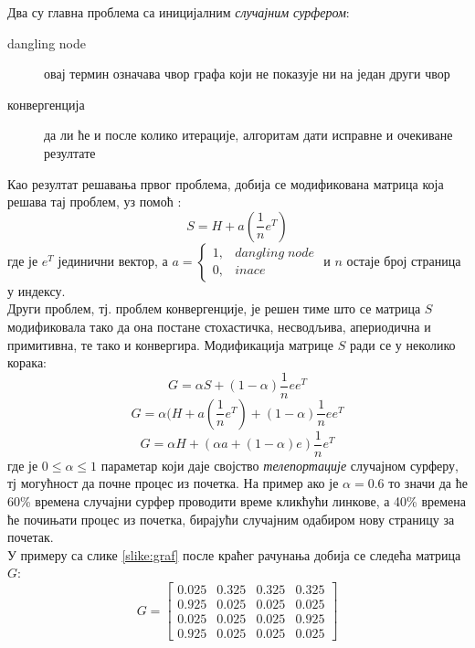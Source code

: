         Два су главна проблема са иницијалним \emph{случајним сурфером}:
        \begin{description}
        \item[dangling node] овај термин означава чвор графа који не показује ни на један други чвор
        \item[конвергенција] да ли ће и после колико итерације, алгоритам дати исправне и очекиване резултате
        \end{description}
        Као резултат решавања првог проблема, добија се модификована матрица која решава тај проблем, уз помоћ :
        \begin{equation}
        S = H + a(\frac{1}{n}e^{T})
        \end{equation}
        где је $e^T$ јединични вектор, а $a = \left\{\begin{matrix}
1, & dangling\; node \\ 
0, & inace
\end{matrix}\right.$ и $n$ остаје број страница у индексу.\\
        Други проблем, тј. проблем конвергенције, је решен тиме што се матрица $S$ модификовала тако да она постане стохастичка, несводљива, апериодична и примитивна, те тако и конвергира. Модификација матрице $S$ ради се у неколико корака: 
        \begin{equation}
        G = \alpha S + (1-\alpha)\frac{1}{n}ee^{T}
        \end{equation}
        \begin{equation}
        G = \alpha(H + a(\frac{1}{n}e^{T})+(1-\alpha)\frac{1}{n}ee^{T}
        \end{equation}
        \begin{equation}
        G = \alpha H + (\alpha a + (1-\alpha)e)\frac{1}{n}e^{T}
        \end{equation}
        где је $0\leqslant\alpha\leqslant1$ параметар који даје својство \emph{телепортације} случајном сурферу, тј могућност да почне процес из почетка. На пример ако је $\alpha=0.6$ то значи да ће 60\% времена случајни сурфер проводити време кликћући линкове, а 40\% времена ће почињати процес из почетка, бирајући случајним одабиром нову страницу за почетак.\\
        У примеру са слике \ref{slike:graf} после краћег рачунања добија се следећа матрица $G$:
\[G = 
\begin{bmatrix}
0.025 & 0.325 & 0.325 & 0.325 \\ 
0.925 & 0.025 & 0.025 & 0.025 \\ 
0.025 & 0.025 & 0.025 & 0.925 \\ 
0.925 & 0.025 & 0.025 & 0.025
\end{bmatrix}
\]
\pagebreak
